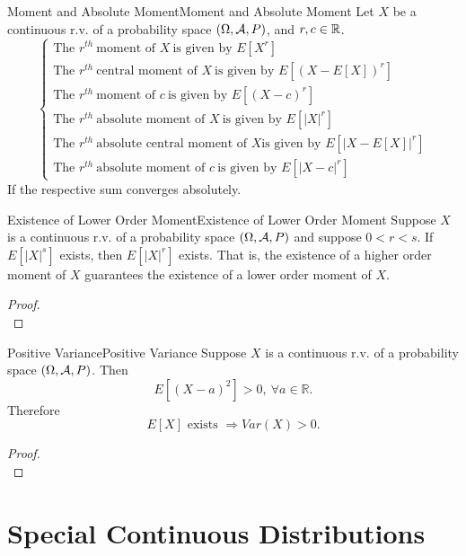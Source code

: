 \documentclass{elegantbook}
\begin{document}
\begin{definition}{Moment and Absolute Moment}{Moment and Absolute Moment}
Let $X$ be a continuous r.v. of a probability space $(\Omega,\mathcal{A}, P)$, and $r,c\in\mathbb{R}$.
$$\left\{
\begin{array}{l}
\text{The }r^{th}\ \text{moment of } X\ \text{is given by } E[X^r ]   \\                              
\text{The }r^{th}\ \text{central moment of } X\ \text{is given by } E[(X-E[X])^r]\\
\text{The }r^{th}\ \text{moment of } c\ \text{is given by } E[(X-c)^r ]      \\     
\text{The }r^{th}\ \text{absolute moment of } X\ \text{is given by } E[|X|^r ]\\
\text{The }r^{th}\ \text{absolute central moment of } X \text{is given by } E[|X-E[X] |^r]  \\
\text{The } r^{th}\ \text{absolute moment of } c\ \text{is given by } E[|X-c|^r ] 
\end{array}
\right.$$
If the respective sum converges absolutely.
\end{definition}

\begin{theorem}{Existence of Lower Order Moment}{Existence of Lower Order Moment}
Suppose $X$ is a continuous r.v. of a probability space $(\Omega,\mathcal{A}, P)$ and suppose $0<r<s$. If $E[|X|^s]$ exists, then $E[|X|^r]$ exists. That is, the existence of a higher order moment of $X$ guarantees the existence of a lower order moment of $X$.
\end{theorem}

\begin{proof}
\\[4cm]\vspace{0.01cm}
\end{proof}

\begin{theorem}{Positive Variance}{Positive Variance}
Suppose $X$ is a continuous r.v. of a probability space $(\Omega,\mathcal{A}, P)$. Then
$$
E\left[\left(X-a\right)^2\right]>0,\ \forall a\in\mathbb{R}.
$$
Therefore
$$
E[X] \text{ exists }\Rightarrow   Var(X)>0.
$$
\end{theorem}

\begin{proof}
\\[4cm]\vspace{0.01cm}
\end{proof}

\chapter{Special Continuous Distributions}
\end{document}
